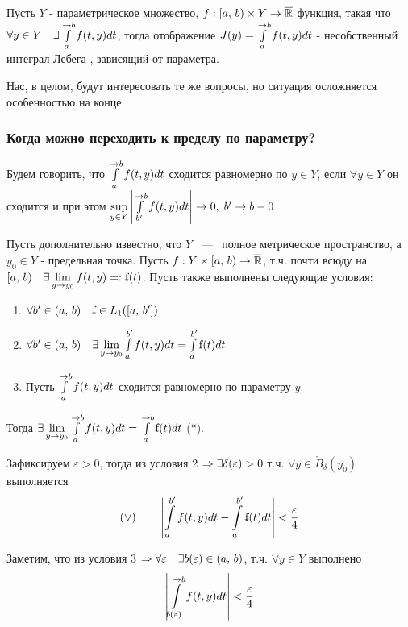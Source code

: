  Пусть $Y$ - параметрическое множество, $f : [a, \, b) \times Y \rightarrow \overline{\mathbb{R}}$ функция, такая что $\forall y \in Y \quad \exists \int\limits^{\rightarrow b}_a f(t, y) d t$, тогда отображение $J(y) = \int\limits_a^{\rightarrow b} f(t, y) d t$ - несобственный интеграл Лебега , зависящий от параметра.

Нас, в целом, будут интересовать те же вопросы, но ситуация осложняется особенностью на конце.

\subsubsection{Когда можно переходить к пределу по параметру?}

 Будем говорить, что $\int\limits^{\rightarrow b}_{a} f(t, y) dt$ сходится равномерно по $y \in Y$, если $\forall y \in Y$ он сходится и при этом $\sup\limits_{y \in Y} \left| \int\limits^{\rightarrow b}_{b'} f(t, y) dt \right| \rightarrow 0, \; b' \rightarrow b - 0$

\theorem Пусть дополнительно известно, что $Y$ ~---~ полное метрическое пространство, а $y_0 \in Y$ - предельная точка. Пусть $f : Y \times [a, \, b) \rightarrow \overline{\mathbb{R}}$, т.ч. почти всюду на $[a, \, b) \quad \exists \lim\limits_{y \ra y_0}f(t, y) =: \ff(t)$. Пусть также выполнены следующие условия:
\begin{enumerate}
    \item $\forall b' \in (a, \, b) \quad \ff \in L_1([a, \, b'])$
    \item $\forall b' \in (a, \, b) \quad \exists\lim\limits_{y \ra y_0} \int\limits^{b'}_a f(t, y) dt = \int\limits^{b'}_a \ff(t) dt$
    \item Пусть $\int\limits_a^{\rightarrow b} f(t, y) dt$ сходится равномерно по параметру $y$.
\end{enumerate}


Тогда $\exists \lim\limits_{y \ra y_0} \int \limits^{\ra b}_a f(t, y) dt = \int\limits^{\ra b}_{a} \ff(t)dt$ (*).

\proof Зафиксируем $\varepsilon > 0$, тогда из условия 2 $\Rightarrow \exists\delta(\varepsilon) > 0$  т.ч. $\forall y \in \mathring{B}_\delta (y_0)$ выполняется
$$(\vee) \qquad \left| \int\limits_a^{b'}f(t, y) dt - \int\limits_a^{b'}\ff(t) dt \right| < \frac{\varepsilon}{4}$$

Заметим, что из условия 3 $\Rightarrow \forall \varepsilon \quad \exists b(\varepsilon) \in (a, \, b)$, т.ч. $\forall y \in Y$ выполнено
$$\left| \int\limits_{b(\varepsilon)}^{\rightarrow b} f(t, y) dt \right| < \frac{\varepsilon}{4}$$

